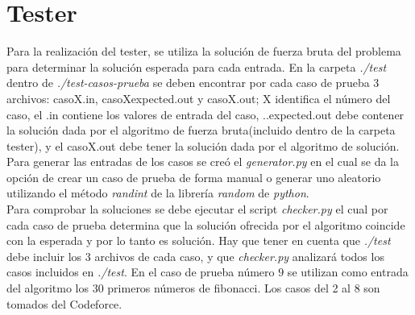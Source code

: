 \documentclass[12pt]{article}
\begin{document}
\section{Tester}

Para la realizaci\'on del tester, se utiliza la soluci\'on de fuerza bruta del problema para determinar la soluci\'on esperada para cada 
entrada. En la carpeta \textit{./test} dentro de \textit{./test-casos-prueba} se deben encontrar por cada caso de prueba 3 archivos: casoX.in,
casoXexpected.out y casoX.out; X identifica el n\'umero del caso, el .in contiene los valores de entrada del caso, ..expected.out debe contener
 la soluci\'on dada por el algoritmo de fuerza bruta(incluido dentro de la carpeta tester), y el casoX.out debe tener la soluci\'on dada por 
el algoritmo de soluci\'on.\\
Para generar las entradas de los casos se cre\'o el \textit{generator.py} en el cual se da la opci\'on de crear un caso de prueba de forma 
manual o generar uno aleatorio utilizando el m\'etodo \textit{randint} de la librer\'ia \textit{random} de \textit{python}.\\
Para comprobar la soluciones se debe ejecutar el script \textit{checker.py} el cual por cada caso de prueba determina que la soluci\'on 
ofrecida por el algoritmo coincide con la esperada y por lo tanto es soluci\'on. Hay que tener en cuenta que  \textit{./test} debe incluir los 3 archivos de cada caso, y que \textit{checker.py} analizar\'a todos los casos incluidos en \textit{./test}. En el caso de prueba n\'umero $9$ se utilizan como entrada del algoritmo los $30$
 primeros n\'umeros de fibonacci. Los casos del 2 al 8 son tomados del Codeforce.\\



  
\end{document}
